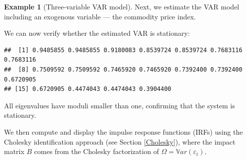 \documentclass[
  12pt,
]{book}
\newenvironment{Shaded}{\begin{snugshade}}{\end{snugshade}}
\newcommand{\AttributeTok}[1]{\textcolor[rgb]{0.13,0.29,0.53}{#1}}
\newcommand{\CommentTok}[1]{\textcolor[rgb]{0.56,0.35,0.01}{\textit{#1}}}
\newcommand{\DecValTok}[1]{\textcolor[rgb]{0.00,0.00,0.81}{#1}}
\newcommand{\FunctionTok}[1]{\textcolor[rgb]{0.13,0.29,0.53}{\textbf{#1}}}
\newcommand{\NormalTok}[1]{#1}
\newcommand{\OtherTok}[1]{\textcolor[rgb]{0.56,0.35,0.01}{#1}}
\newcommand{\SpecialCharTok}[1]{\textcolor[rgb]{0.81,0.36,0.00}{\textbf{#1}}}
\newcommand{\StringTok}[1]{\textcolor[rgb]{0.31,0.60,0.02}{#1}}
\theoremstyle{definition}
\theoremstyle{definition}
\newtheorem{example}{Example}[chapter]
\theoremstyle{definition}
\theoremstyle{definition}
\theoremstyle{remark}
\begin{document}
\begin{example}[Three-variable VAR model]
Next, we estimate the VAR model including an exogenous variable --- the commodity price index.

\begin{Shaded}
\end{Shaded}

We can now verify whether the estimated VAR is stationary:

\begin{Shaded}
\end{Shaded}

\begin{verbatim}
##  [1] 0.9485855 0.9485855 0.9180083 0.8539724 0.8539724 0.7683116 0.7683116
##  [8] 0.7509592 0.7509592 0.7465920 0.7465920 0.7392400 0.7392400 0.6720905
## [15] 0.6720905 0.4474043 0.4474043 0.3904400
\end{verbatim}

All eigenvalues have moduli smaller than one, confirming that the system is stationary.

We then compute and display the impulse response functions (IRFs) using the Cholesky identification approach (see Section \ref{Cholesky}), where the impact matrix \(B\) comes from the Cholesky factorization of \(\Omega = \mathbb{V}ar(\varepsilon_t)\).


\end{example}
\end{document}
